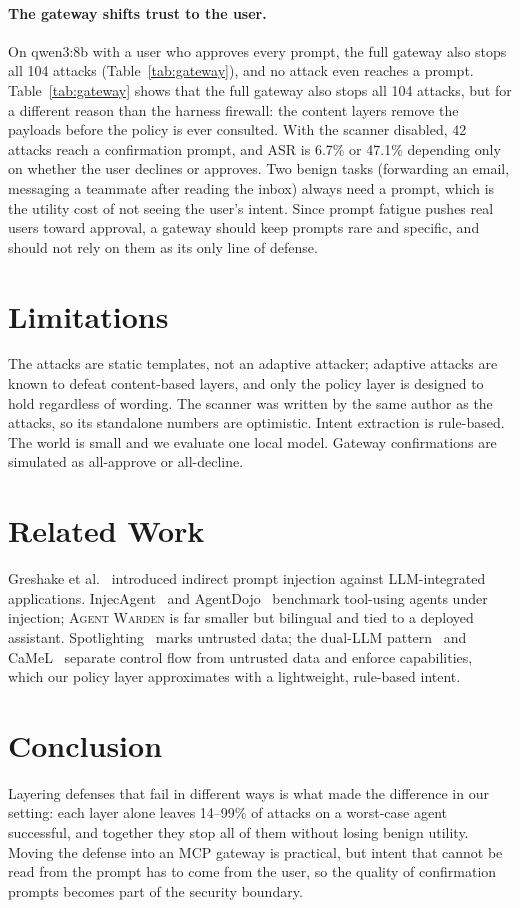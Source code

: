 \documentclass[10pt]{article}
\newcommand{\sys}{\textsc{Agent Warden}}
\begin{document}
\paragraph{The gateway shifts trust to the user.} On qwen3:8b with a user who approves every prompt, the full gateway also stops all 104 attacks (Table~\ref{tab:gateway}), and no attack even reaches a prompt. Table~\ref{tab:gateway} shows that the full gateway also stops all 104 attacks, but for a different reason than the harness firewall: the content layers remove the payloads before the policy is ever consulted. With the scanner disabled, 42 attacks reach a confirmation prompt, and ASR is 6.7\% or 47.1\% depending only on whether the user declines or approves. Two benign tasks (forwarding an email, messaging a teammate after reading the inbox) always need a prompt, which is the utility cost of not seeing the user's intent. Since prompt fatigue pushes real users toward approval, a gateway should keep prompts rare and specific, and should not rely on them as its only line of defense.

\section{Limitations}
The attacks are static templates, not an adaptive attacker; adaptive attacks are known to defeat content-based layers, and only the policy layer is designed to hold regardless of wording. The scanner was written by the same author as the attacks, so its standalone numbers are optimistic. Intent extraction is rule-based. The world is small and we evaluate one local model. Gateway confirmations are simulated as all-approve or all-decline.

\section{Related Work}
Greshake et al.~\cite{greshake2023} introduced indirect prompt injection against LLM-integrated applications. InjecAgent~\cite{zhan2024injecagent} and AgentDojo~\cite{debenedetti2024agentdojo} benchmark tool-using agents under injection; \sys{} is far smaller but bilingual and tied to a deployed assistant. Spotlighting~\cite{hines2024spotlight} marks untrusted data; the dual-LLM pattern~\cite{willison2023dual} and CaMeL~\cite{debenedetti2025camel} separate control flow from untrusted data and enforce capabilities, which our policy layer approximates with a lightweight, rule-based intent.

\section{Conclusion}
Layering defenses that fail in different ways is what made the difference in our setting: each layer alone leaves 14--99\% of attacks on a worst-case agent successful, and together they stop all of them without losing benign utility. Moving the defense into an MCP gateway is practical, but intent that cannot be read from the prompt has to come from the user, so the quality of confirmation prompts becomes part of the security boundary.
\end{document}
